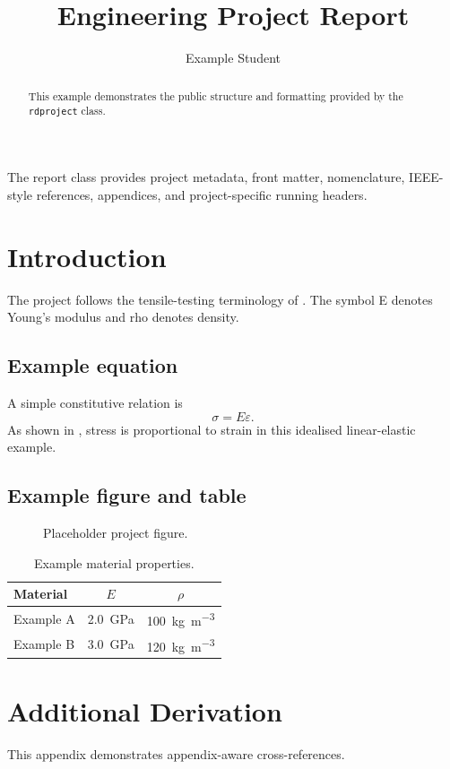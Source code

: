 \documentclass[screen,oneside]{rdproject}
\title{Engineering Project Report}
\author{Example Student}
\begin{document}
\frontmatter
\maketitle

\begin{abstract}
This example demonstrates the public structure and formatting provided by the
\texttt{rdproject} class.
\end{abstract}

\begin{preface}
The report class provides project metadata, front matter, nomenclature,
IEEE-style references, appendices, and project-specific running headers.
\end{preface}

\tableofcontents
\glsaddall
\printglossary[style=NoahNomenclature,title={Nomenclature}]
\printlistoffigures
\printlistoftables

\mainmatter

\chapter{Introduction}
The project follows the tensile-testing terminology of \cite{iso1926}.
The symbol \gls{E} denotes Young's modulus and \gls{rho} denotes density.

\section{Example equation}
A simple constitutive relation is
\begin{equation}
  \sigma = E\varepsilon.
  \label{eq:hooke}
\end{equation}
As shown in , stress is proportional to strain in this idealised
linear-elastic example.

\section{Example figure and table}
\begin{figure}[htbp]
  \centering
  \fbox{\rule{0pt}{35mm}\rule{0.65\linewidth}{0pt}}
  \caption{Placeholder project figure.}
  \label{fig:placeholder}
\end{figure}

\begin{table}[htbp]
  \centering
  \caption{Example material properties.}
  \label{tab:properties}
  \begin{tabular}{lcc}
    \toprule
    Material & \(E\) & \(\rho\) \\
    \midrule
    Example A & \qty{2.0}{\giga\pascal} & \qty{100}{\kilogram\per\meter\cubed} \\
    Example B & \qty{3.0}{\giga\pascal} & \qty{120}{\kilogram\per\meter\cubed} \\
    \bottomrule
  \end{tabular}
\end{table}

\appendix
\chapter{Additional Derivation}\label{app:derivation}
This appendix demonstrates appendix-aware cross-references.

\backmatter
\printreferences
\end{document}

